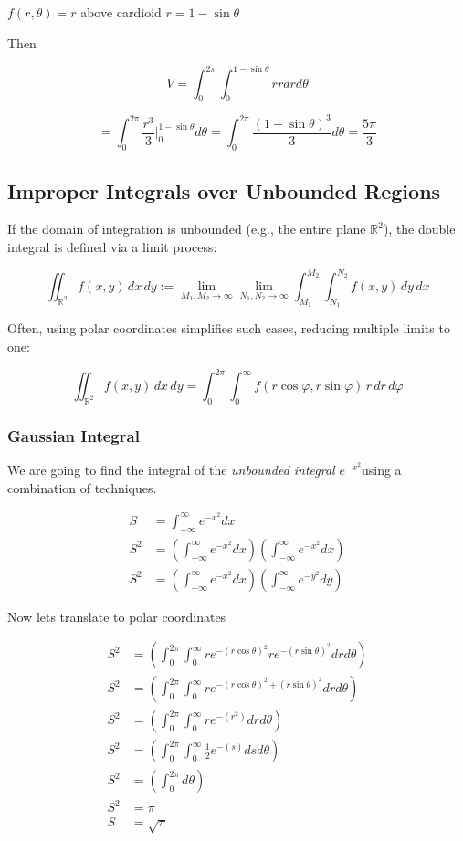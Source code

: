 \(f(r, \theta) = r\) above cardioid \(r = 1 - \sin \theta\)

Then

\[
V = \int_{0}^{2\pi}\int_{0}^{1 - \sin \theta} r r dr d\theta
\]

\[
= \int_{0}^{2\pi}\frac{r^3}{3} |_{0}^{1 - \sin \theta} d\theta = \int_{0}^{2\pi} \frac{{(1 - \sin\theta)}^3}{3} d\theta = \frac{5 \pi}{3}
\]


\subsection{Improper Integrals over Unbounded Regions}

If the domain of integration is unbounded (e.g., the entire plane \( \mathbb{R}^2 \)), the double integral is defined via a limit process:

\[
\iint_{\mathbb{R}^2} f(x, y)\, dx\, dy := \lim_{M_1, M_2 \to \infty} \lim_{N_1, N_2 \to \infty}
\int_{M_1}^{M_2} \int_{N_1}^{N_2} f(x, y)\, dy\, dx
\]

Often, using polar coordinates simplifies such cases, reducing multiple limits to one:

\[
\iint_{\mathbb{R}^2} f(x, y)\, dx\, dy = \int_0^{2\pi} \int_0^{\infty} f(r \cos \varphi, r \sin \varphi)\, r\, dr\, d\varphi
\]


\subsubsection{Gaussian Integral}

We are going to find the integral of the \emph{unbounded integral} 
\(e^{-x^2}\)using a combination of techniques.

\begin{align*}
S &= \int_{-\infty}^{\infty} e^{-x^2}dx\\
S^2 &= \left(\int_{-\infty}^{\infty} e^{-x^2}dx\right) \left(\int_{-\infty}^{\infty} e^{-x^2}dx\right)\\
S^2 &= \left(\int_{-\infty}^{\infty} e^{-x^2}dx\right) \left(\int_{-\infty}^{\infty} e^{-y^2}dy\right)
\end{align*}

Now lets translate to polar coordinates

\begin{align*}
S^2 &= \left(\int_{0}^{2\pi} \int_{0}^{\infty}re^{-{(r\cos\theta)}^2} re^{-{(r\sin\theta)}^2}drd\theta\right)\\
S^2 &= \left(\int_{0}^{2\pi} \int_{0}^{\infty}re^{-{(r\cos\theta)}^2 + {(r\sin\theta)}^2}drd\theta\right)\\
S^2 &= \left(\int_{0}^{2\pi} \int_{0}^{\infty}re^{-(r^2)}drd\theta\right)\\
S^2 &=  \left(\int_{0}^{2\pi} \int_{0}^{\infty}\frac{1}{2}e^{-(s)}dsd\theta\right)\\
S^2 &= \left(\int_{0}^{2\pi}d\theta\right)\\
S^2 &= \pi\\
S   &= \sqrt{\pi}
\end{align*}

